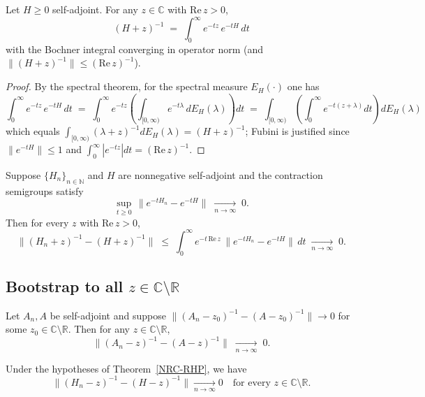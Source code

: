 \documentclass[11pt]{article}
\begin{document}
\begin{lemma}\label{Laplace}
Let $H\ge 0$ self-adjoint. For any $z\in\mathbb{C}$ with $\mathrm{Re}\,z>0$,
\[
(H+z)^{-1} \;=\; \int_0^\infty e^{-t z}\, e^{-t H}\,dt
\]
with the Bochner integral converging in operator norm (and $\|(H+z)^{-1}\|\le (\mathrm{Re}\,z)^{-1}$).
\end{lemma}

\begin{proof}
By the spectral theorem, for the spectral measure $E_H(\cdot)$ one has
\[
\int_0^\infty e^{-t z}\, e^{-t H}\,dt \;=\; \int_0^\infty e^{-t z}\left(\int_{[0,\infty)} e^{-t\lambda}\,dE_H(\lambda)\right)dt
\;=\; \int_{[0,\infty)} \left(\int_0^\infty e^{-t(z+\lambda)}dt\right) dE_H(\lambda)
\]
which equals $\int_{[0,\infty)} (\lambda+z)^{-1} dE_H(\lambda)=(H+z)^{-1}$; Fubini is justified since $\|e^{-tH}\|\le 1$ and $\int_0^\infty |e^{-tz}|dt=(\mathrm{Re}\,z)^{-1}$.
\end{proof}

\begin{theorem}\label{NRC-RHP}
Suppose $\{H_n\}_{n\in\mathbb{N}}$ and $H$ are nonnegative self-adjoint and the contraction semigroups satisfy
\[
\sup_{t\ge 0}\,\|e^{-tH_n}-e^{-tH}\| \;\xrightarrow[n\to\infty]{}\;0.
\]
Then for every $z$ with $\mathrm{Re}\,z>0$,
\[
\|(H_n+z)^{-1}-(H+z)^{-1}\| \;\le\; \int_0^\infty e^{-t\,\mathrm{Re}\,z}\,\|e^{-tH_n}-e^{-tH}\|\,dt \;\xrightarrow[n\to\infty]{}\; 0.
\]
\end{theorem}

\subsection{Bootstrap to all $z\in\mathbb{C}\setminus\mathbb{R}$}

\begin{lemma}\label{bootstrap}
Let $A_n,A$ be self-adjoint and suppose $\|(A_n-z_0)^{-1}-(A-z_0)^{-1}\|\to 0$ for some $z_0\in\mathbb{C}\setminus\mathbb{R}$. Then for any $z\in\mathbb{C}\setminus\mathbb{R}$,
\[
\|(A_n-z)^{-1}-(A-z)^{-1}\|\;\xrightarrow[n\to\infty]{}\;0.
\]
\end{lemma}

\begin{theorem}\label{NRC-allz}
Under the hypotheses of Theorem~\ref{NRC-RHP}, we have
\[
\|(H_n-z)^{-1}-(H-z)^{-1}\| \xrightarrow[n\to\infty]{} 0
\quad\text{for every } z\in\mathbb{C}\setminus\mathbb{R}.
\]
\end{theorem}
\end{document}
